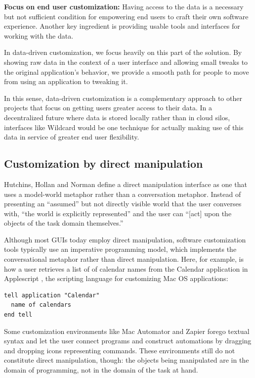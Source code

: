 \documentclass[sigplan,screen,10pt,anonymous,review]{acmart}
\begin{document}
\textbf{Focus on end user customization:} Having access to the data is a
necessary but not sufficient condition for empowering end users to craft
their own software experience. Another key ingredient is providing
usable tools and interfaces for working with the data.

In data-driven customization, we focus heavily on this part of the
solution. By showing raw data in the context of a user interface and
allowing small tweaks to the original application's behavior, we provide
a smooth path for people to move from using an application to tweaking
it.

In this sense, data-driven customization is a complementary approach to
other projects that focus on getting users greater access to their data.
In a decentralized future where data is stored locally rather than in
cloud silos, interfaces like Wildcard would be one technique for
actually making use of this data in service of greater end user
flexibility.

\hypertarget{sec:dm}{%
\subsection{Customization by direct manipulation}\label{sec:dm}}

Hutchins, Hollan and Norman \citep{hutchins1985} define a direct
manipulation interface as one that uses a model-world metaphor rather
than a conversation metaphor. Instead of presenting an ``assumed'' but
not directly visible world that the user converses with, ``the world is
explicitly represented'' and the user can ``{[}act{]} upon the objects
of the task domain themselves.''

Although most GUIs today employ direct manipulation, software
customization tools typically use an imperative programming model, which
implements the conversational metaphor rather than direct manipulation.
Here, for example, is how a user retrieves a list of of calendar names
from the Calendar application in Applescript \citep{cook2007}, the
scripting language for customizing Mac OS applications:

\begin{verbatim}
tell application "Calendar"
  name of calendars
end tell
\end{verbatim}

Some customization environments like Mac Automator and Zapier forego
textual syntax and let the user connect programs and construct
automations by dragging and dropping icons representing commands. These
environments still do not constitute direct manipulation, though: the
objects being manipulated are in the domain of programming, not in the
domain of the task at hand.
\end{document}
